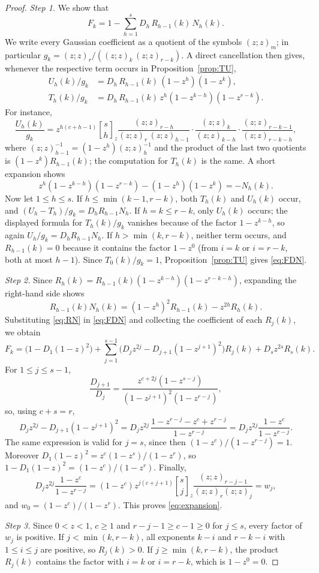 \documentclass{amsart}
\theoremstyle{remark}
\numberwithin{equation}{section}
\newcommand{\qbinom}[3]{\genfrac{[}{]}{0pt}{}{#1}{#2}_{#3}}
\newcommand{\poch}[1]{(z;z)_{#1}}
\begin{document}
\begin{proof}
\emph{Step 1.} We show that
\begin{equation}\label{eq:FDN}
  F_k=1-\sum_{h=1}^{s}D_h\,R_{h-1}(k)\,N_h(k).
\end{equation}
We write every Gaussian coefficient as a quotient of the symbols $\poch m$; in particular $g_k=\poch{r}/(\poch k\,\poch{r-k})$. A direct cancellation then gives, whenever the respective term occurs in Proposition~\ref{prop:TU},
\begin{align*}
  U_h(k)/g_k&=D_h\,R_{h-1}(k)\,(1-z^h)(1-z^k),\\
  T_h(k)/g_k&=D_h\,R_{h-1}(k)\,z^h(1-z^{k-h})(1-z^{r-k}).
\end{align*}
For instance,
\[
  \frac{U_h(k)}{g_k}=z^{h(c+h-1)}\qbinom{s}{h}{z}\frac{\poch{r-h}}{\poch r\,\poch{h-1}}\cdot\frac{\poch k}{\poch{k-h}}\cdot\frac{\poch{r-k-1}}{\poch{r-k-h}},
\]
where $\poch{h-1}^{-1}=(1-z^h)\poch{h}^{-1}$ and the product of the last two quotients is $(1-z^k)R_{h-1}(k)$; the computation for $T_h(k)$ is the same. A short expansion shows
\[
  z^h(1-z^{k-h})(1-z^{r-k})-(1-z^h)(1-z^k)=-N_h(k).
\]
Now let $1\le h\le s$. If $h\le\min(k-1,r-k)$, both $T_h(k)$ and $U_h(k)$ occur, and $(U_h-T_h)/g_k=D_hR_{h-1}N_h$. If $h=k\le r-k$, only $U_h(k)$ occurs; the displayed formula for $T_h(k)/g_k$ vanishes because of the factor $1-z^{k-h}$, so again $U_h/g_k=D_hR_{h-1}N_h$. If $h>\min(k,r-k)$, neither term occurs, and $R_{h-1}(k)=0$ because it contains the factor $1-z^0$ (from $i=k$ or $i=r-k$, both at most $h-1$). Since $T_0(k)/g_k=1$, Proposition~\ref{prop:TU} gives \eqref{eq:FDN}.

\emph{Step 2.} Since $R_h(k)=R_{h-1}(k)(1-z^{k-h})(1-z^{r-k-h})$, expanding the right-hand side shows
\begin{equation}\label{eq:RN}
  R_{h-1}(k)N_h(k)=(1-z^h)^2R_{h-1}(k)-z^{2h}R_h(k).
\end{equation}
Substituting \eqref{eq:RN} in \eqref{eq:FDN} and collecting the coefficient of each $R_j(k)$, we obtain
\[
  F_k=\bigl(1-D_1(1-z)^2\bigr)+\sum_{j=1}^{s-1}\bigl(D_jz^{2j}-D_{j+1}(1-z^{j+1})^2\bigr)R_j(k)+D_sz^{2s}R_s(k).
\]
For $1\le j\le s-1$,
\[
  \frac{D_{j+1}}{D_j}=\frac{z^{c+2j}(1-z^{s-j})}{(1-z^{j+1})^2(1-z^{r-j})},
\]
so, using $c+s=r$,
\[
  D_jz^{2j}-D_{j+1}(1-z^{j+1})^2=D_jz^{2j}\,\frac{1-z^{r-j}-z^c+z^{r-j}}{1-z^{r-j}}=D_jz^{2j}\frac{1-z^c}{1-z^{r-j}}.
\]
The same expression is valid for $j=s$, since then $(1-z^c)/(1-z^{r-j})=1$. Moreover $D_1(1-z)^2=z^c(1-z^s)/(1-z^r)$, so $1-D_1(1-z)^2=(1-z^c)/(1-z^r)$. Finally,
\[
  D_jz^{2j}\frac{1-z^c}{1-z^{r-j}}=(1-z^c)z^{j(c+j+1)}\qbinom{s}{j}{z}\frac{\poch{r-j-1}}{\poch r\poch j}=w_j,
\]
and $w_0=(1-z^c)/(1-z^r)$. This proves \eqref{eq:expansion}.

\emph{Step 3.} Since $0<z<1$, $c\ge1$ and $r-j-1\ge c-1\ge0$ for $j\le s$, every factor of $w_j$ is positive. If $j<\min(k,r-k)$, all exponents $k-i$ and $r-k-i$ with $1\le i\le j$ are positive, so $R_j(k)>0$. If $j\ge\min(k,r-k)$, the product $R_j(k)$ contains the factor with $i=k$ or $i=r-k$, which is $1-z^0=0$.
\end{proof}
\end{document}
